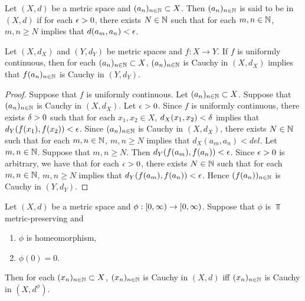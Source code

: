 \documentclass{book}
\begin{document}
\begin{defn} 
	Let $(X, d)$ be a metric space and $(a_n)_{n \in \mathbb{N}} \subset X$. Then $(a_n)_{n \in \mathbb{N}}$ is said to be  in $(X, d)$ if for each $\epsilon > 0$, there exists $N \in \mathbb{N}$ such that for each $m,n \in \mathbb{N}$, $m,n \geq N$ implies that $d(a_m, a_n) < \epsilon$.
\end{defn}

\begin{ex} 
	Let $(X, d_X)$ and $(Y, d_Y)$ be metric spaces and $f:X \rightarrow Y$. If $f$ is uniformly continuous, then for each $(a_n)_{n \in \mathbb{N}} \subset X$, $(a_n)_{n \in \mathbb{N}}$ is Cauchy in $(X, d_X)$ implies that $f(a_n)_{n \in \mathbb{N}}$ is Cauchy in $(Y, d_Y)$.
\end{ex}

\begin{proof}
	Suppose that $f$ is uniformly continuous. Let $(a_n)_{n \in \mathbb{N}} \subset X$. Suppose that $(a_n)_{n \in \mathbb{N}}$ is Cauchy in $(X, d_X)$. Let $\epsilon > 0$. Since $f$ is uniformly continuous, there exists $\delta > 0$ such that for each $x_1, x_2 \in X$, $d_X(x_1, x_2) < \delta$ implies that $d_Y(f(x_1), f(x_2)) < \epsilon$. Since $(a_n)_{n \in \mathbb{N}}$ is Cauchy in $(X, d_X)$, there exists $N \in \mathbb{N}$ such that for each $m,n \in \mathbb{N}$, $m, n \geq N$ implies that $d_X(a_m, a_n) < del$. Let $m,n \in \mathbb{N}$. Suppose that $m,n \geq N$. Then $d_Y(f(a_m), f(a_n)) < \epsilon$. Since $\epsilon > 0$ is arbitrary, we have that for each $\epsilon > 0$, there exists $N \in \mathbb{N}$ such that for each $m,n \in \mathbb{N}$, $m,n \geq N$ implies that $d_Y(f(a_m), f(a_n)) < \epsilon$. Hence $(f(a_n))_{n \in \mathbb{N}}$ is Cauchy in $(Y, d_Y)$.
\end{proof}

\begin{ex} 
	Let $(X,d)$ be a metric space and $\phi:[0,\infty) \rightarrow [0,\infty)$. Suppose that $\phi$ is $\Top$ metric-preserving and
	\begin{enumerate}
		\item $\phi$ is homeomorphism, 
		\item $\phi(0) = 0$.
	\end{enumerate}
	Then for each $(x_n)_{n \in \mathbb{N}} \subset X$, $(x_n)_{n \in \mathbb{N}}$ is Cauchy in $(X, d)$ iff $(x_n)_{n \in \mathbb{N}}$ is Cauchy in $(X, d^{\phi})$.
\end{ex}
\end{document}
